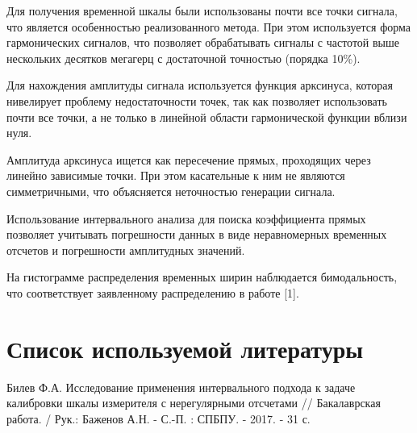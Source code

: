 \documentclass[12pt,a4paper]{article}
\begin{document}
Для получения временной шкалы были использованы почти все точки сигнала, что является особенностью реализованного метода. При этом используется форма гармонических сигналов, что позволяет обрабатывать сигналы с частотой выше нескольких десятков мегагерц с достаточной точностью (порядка 10\%).

Для нахождения амплитуды сигнала используется функция арксинуса, которая нивелирует проблему недостаточности точек, так как позволяет использовать почти все точки, а не только в линейной области гармонической функции вблизи нуля.

Амплитуда арксинуса ищется как пересечение прямых, проходящих через
линейно зависимые точки. При этом касательные к ним не являются симметричными, что объясняется неточностью генерации сигнала.

Использование интервального анализа для поиска коэффициента прямых позволяет учитывать погрешности данных в виде неравномерных временных отсчетов и погрешности амплитудных значений.

На гистограмме распределения временных ширин наблюдается бимодальность, что соответствует заявленному распределению в работе [1].

\section{Список используемой литературы}
\begin{thebibliography}{1}
Билев Ф.А. Исследование применения интервального подхода к задаче калибровки шкалы измерителя с нерегулярными отсчетами // Бакалаврская работа. / Рук.: Баженов А.Н. - С.-П. : СПБПУ. - 2017. - 31 с.
\end{thebibliography}
\end{document}
